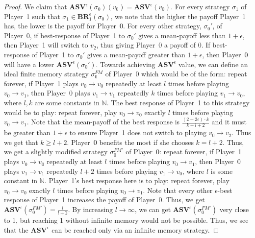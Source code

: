 \begin{proof}
We claim that $\mathbf{ASV}^{\epsilon}(\sigma_0)(v_0) = \mathbf{ASV}^{\epsilon}(v_0)$. For every strategy $\sigma_1$ of Player~1 such that $\sigma_1 \in \mathbf{BR}_1^{\epsilon}(\sigma_0)$, we note that the higher the payoff Player~1 has, the lower is the payoff for Player~0. For every other strategy, $\sigma_0'$, of Player~0, if best-response of Player~1 to $\sigma_0'$ gives a mean-payoff less than $1+\epsilon$, then Player~1 will switch to $v_2$, thus giving Player~0 a payoff of 0. If best-response of Player~1 to $\sigma_0'$ gives a mean-payoff greater than $1+\epsilon$, then Player~0 will have a lower $\mathbf{ASV}^{\epsilon}(\sigma_0')$. Towards achieving $\mathbf{ASV}^{\epsilon}$ value, we can define an ideal finite memory strategy $\sigma_0^{FM}$ of Player~0 which would be of the form: repeat forever, if Player~1 plays $v_0 \to v_0$ repeatedly at least $l$ times before playing $v_0 \to v_1$, then Player~0 plays $v_1 \to v_1$ repeatedly $k$ times before playing $v_1 \to v_0$, where $l, k$ are some constants in $\mathbb{N}$. The best response of Player~1 to this strategy would be to play: repeat forever, play $v_0 \to v_0$ exactly $l$ times before playing $v_0 \to v_1$. Note that the mean-payoff of the best response is $\frac{(2+2\epsilon)\cdot k}{k + l + 2}$ and it must be greater than $1 + \epsilon$ to ensure Player~1 does not switch to playing $v_0 \to v_2$. Thus we get that $k \geqslant l + 2$. Player~0 benefits the most if she chooses $k = l+2$. Thus, we get a slightly modified strategy $\sigma_0^{FM'}$ of Player~0: repeat forever, if Player~1 plays $v_0 \to v_0$ repeatedly at least $l$ times before playing $v_0 \to v_1$, then Player~0 plays $v_1 \to v_1$ repeatedly $l+2$ times before playing $v_1 \to v_0$, where $l$ is  some constant in $\mathbb{N}$. Player~1's best response here is to play: repeat forever, play $v_0 \to v_0$ exactly $l$ times before playing $v_0 \to v_1$. Note that every other $\epsilon$-best response of Player~1 increases the payoff of Player~0. Thus, we get $\mathbf{ASV}^{\epsilon}(\sigma_0^{FM'}) = \frac{l}{l+2}$. By increasing $l \to \infty$, we can get $\mathbf{ASV}^{\epsilon}(\sigma_0^{FM'})$ very close to 1, but reaching 1 without infinite memory would not be possible. Thus, we see that the $\mathbf{ASV}^{\epsilon}$ can be reached only via an infinite memory strategy.
\end{proof}